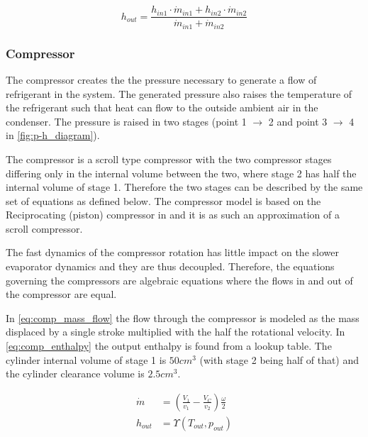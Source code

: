 \begin{equation} \label{eq:PipeJoiningJunction_Enthalpy}
	h_{out} = \frac{h_{in1} \cdot \dot{m}_{in1} + h_{in2} \cdot \dot{m}_{in2}}{ \dot{m}_{in1} + \dot{m}_{in2} }
\end{equation}




\subsubsection{Compressor}
The compressor creates the the pressure necessary to generate a flow of refrigerant in the system. The generated pressure also raises the temperature of the refrigerant such that heat can flow to the outside ambient air in the condenser. The pressure is raised in two stages (point 1 $\rightarrow$ 2 and point 3 $\rightarrow$ 4 in \cref{fig:p-h_diagram}).

The compressor is a scroll type compressor with the two compressor stages differing only in the internal volume between the two, where stage 2 has half the internal volume of stage 1. Therefore the two stages can be described by the same set of equations as defined below. The compressor model is based on the Reciprocating (piston) compressor in \cite{Sorensen2013} and it is as such an approximation of a scroll compressor. 

The fast dynamics of the compressor rotation has little impact on the slower evaporator dynamics and they are thus decoupled. Therefore, the equations governing the compressors are algebraic equations where the flows in and out of the compressor are equal.

In \cref{eq:comp_mass_flow} the flow through the compressor is modeled as the mass displaced by a single stroke multiplied with the half the rotational velocity.
In \cref{eq:comp_enthalpy} the output enthalpy is found from a lookup table. The cylinder internal volume of stage 1 is $50cm^3$ (with stage 2 being half of that) and the cylinder clearance volume is $2.5cm^3$.

\begin{align}
	\dot{m} &= \left(\frac{V_1}{v_1} - \frac{V_C}{v_2}\right) \frac{\omega}{2} \label{eq:comp_mass_flow} \\
	h_{out} &= \Upsilon(T_{out}, p_{out}) \label{eq:comp_enthalpy}
\end{align}

